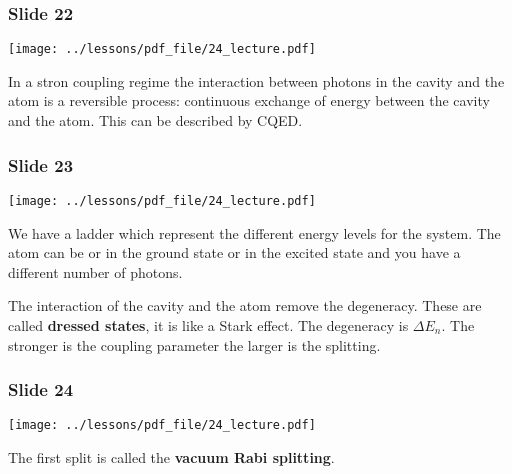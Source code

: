 \documentclass[../main/main.tex]{subfiles}
\begin{document}
\subsubsection*{Slide 22}

\begin{minipage}[]{0.5\linewidth}
\centering
\texttt{[image: ../lessons/pdf\_file/24\_lecture.pdf]}
\end{minipage}
\hspace{0.3cm}\vspace{0.3cm}
\begin{minipage}[c]{0.47\linewidth}

In a stron coupling regime the interaction between photons in the cavity and the atom is a reversible process: continuous exchange of energy between the cavity and the atom. This can be described by CQED.

\end{minipage}

\subsubsection*{Slide 23}

\begin{minipage}[]{0.5\linewidth}
\centering
\texttt{[image: ../lessons/pdf\_file/24\_lecture.pdf]}
\end{minipage}
\hspace{0.3cm}\vspace{0.3cm}
\begin{minipage}[c]{0.47\linewidth}

We have a ladder which represent the different energy levels for the system. The atom can be or in the ground state or in the excited state and you have a different number of photons.

The interaction of the cavity and the atom remove the degeneracy. These are called \textbf{dressed states}, it is like a Stark effect. The degeneracy is \( \Delta E_n \). The stronger is the coupling parameter the larger is the splitting.

\end{minipage}

\subsubsection*{Slide 24}

\begin{minipage}[]{0.5\linewidth}
\centering
\texttt{[image: ../lessons/pdf\_file/24\_lecture.pdf]}
\end{minipage}
\hspace{0.3cm}\vspace{0.3cm}
\begin{minipage}[c]{0.47\linewidth}

The first split is called the \textbf{vacuum Rabi splitting}.

\end{minipage}
\end{document}
